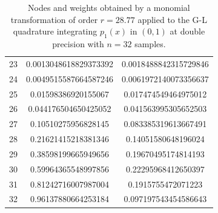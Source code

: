 \documentclass[a4paper, twosided]{book}
\begin{document}
\begin{table}[H]
\begin{tabular}{|c||c|c|}
23  &  0.0013048618829373392   &  0.0018488842315729846   \\
24  &  0.0049515587664587246   &  0.0061972140073356637   \\
25  &  0.01598386920155067     &  0.017474549464975012    \\
26  &  0.044176504650425052    &  0.041563995305652503    \\
27  &  0.10510275956828145     &  0.083385319613667491    \\
28  &  0.21621415218381346     &  0.14051580648196024     \\
29  &  0.38598199665949656     &  0.19670495174814193     \\
30  &  0.59964365548997856     &  0.22295968412650397     \\
31  &  0.81242716007987004     &  0.1915755472071223      \\
32  &  0.96137880664253184     &  0.097197543454586643    \\
\hline
\end{tabular}
  \caption{Nodes and weights obtained by a monomial transformation of order $r=28.77$ applied to the G-L quadrature integrating $p_1(x)$ in $(0,1)$ at double precision with $n=32$ samples.}
  \label{table2.1}
\end{table}
\end{document}
